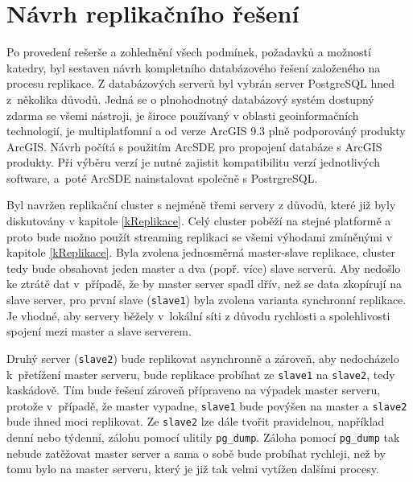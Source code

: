 \section{Návrh replikačního řešení}
  Po provedení rešerše a zohlednění všech podmínek, požadavků a možností
  katedry, byl sestaven návrh kompletního databázového řešení založeného na
  procesu replikace. Z databázových serverů byl vybrán server PostgreSQL hned
  z~několika důvodů. Jedná se o plnohodnotný databázový systém dostupný zda\-rma
  se všemi nástroji, je široce používaný v oblasti geoinformačních technologií,
  je multiplatfomní a od verze ArcGIS 9.3 plně podporováný produkty ArcGIS.
  Návrh počítá s použitím ArcSDE pro propojení databáze s ArcGIS produkty. Při
  výběru verzí je nutné zajistit kompatibilitu verzí jednotlivých software,
  a~poté ArcSDE nainstalovat společně s PostrgreSQL.

  Byl navržen replikační cluster s nejméně třemi servery z důvodů, které již
  byly diskutovány v kapitole \ref{kReplikace}. Celý cluster poběží na stejné
  platformě a proto bude možno použít streaming replikaci se všemi výhodami
  zmíněnými v kapitole \ref{kReplikace}. Byla zvolena jednosměrná master-slave
  replikace, cluster tedy bude obsahovat jeden master a dva (popř. více) slave
  serverů. Aby nedošlo ke ztrátě dat v~případě, že by master server spadl dřív,
  než se data zkopírují na slave server, pro první slave (\texttt{slave1}) byla
  zvolena varianta synchronní replikace. Je vhodné, aby servery běžely
  v~lokální síti z důvodu rychlosti a spolehlivosti spojení mezi master a slave
  serverem. 


  Druhý server (\texttt{slave2}) bude replikovat asynchronně a zároveň, aby
  ne\-do\-chá\-ze\-lo k~přetížení master serveru, bude replikace probíhat ze
  \texttt{slave1} na \texttt{slave2}, tedy kaskádově. Tím bude řešení zároveň
  přípraveno na výpadek master serveru, protože v~případě, že master vypadne,
  \texttt{slave1} bude povýšen na master a \texttt{slave2} bude ihned moci
  replikovat. Ze \texttt{slave2} lze dále tvořit pravidelnou, například denní
  nebo týdenní, zálohu pomocí ulitily \texttt{pg\_dump}. Záloha pomocí
  \texttt{pg\_dump} tak nebude zatěžovat master server a sama o sobě bude
  probíhat rychleji, než by tomu bylo na master serveru, který je již tak velmi
  vytížen dalšími procesy.

